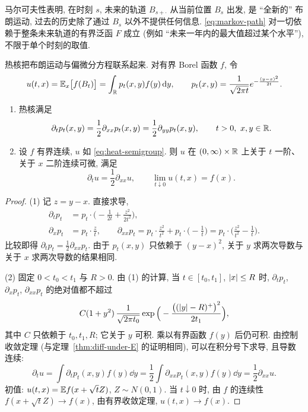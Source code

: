 \begin{intuition}
马尔可夫性表明, 在时刻 $s$, 未来的轨道 $B_{s+\cdot}$ 从当前位置 $B_s$ 出发, 是 ``全新的'' 布朗运动, 过去的历史除了通过 $B_s$ 以外不提供任何信息. \eqref{eq:markov-path} 对一切依赖于整条未来轨道的有界泛函 $F$ 成立 (例如 ``未来一年内的最大值超过某个水平''), 不限于单个时刻的取值.
\end{intuition}

热核把布朗运动与偏微分方程联系起来. 对有界 Borel 函数 $f$, 令
\begin{equation}\label{eq:heat-semigroup}
u(t,x)=\mathbb{E}_x\big[f(B_t)\big]=\int_{\mathbb{R}}p_t(x,y)f(y)\mathop{}\!\mathrm{d} y,\qquad p_t(x,y)=\frac{1}{\sqrt{2\pi t}}e^{-\frac{(y-x)^2}{2t}}.
\end{equation}

\begin{theorem}[热方程]\label{thm:heat-equation}
\begin{enumerate}
\item 热核满足
\[
\partial_tp_t(x,y)=\frac{1}{2}\partial_{xx}p_t(x,y)=\frac{1}{2}\partial_{yy}p_t(x,y),\qquad t>0,\ x,y\in\mathbb{R}.
\]
\item 设 $f$ 有界连续, $u$ 如 \eqref{eq:heat-semigroup}. 则 $u$ 在 $(0,\infty)\times\mathbb{R}$ 上关于 $t$ 一阶、关于 $x$ 二阶连续可微, 满足
\[
\partial_tu=\frac{1}{2}\partial_{xx}u,\qquad \lim_{t\downarrow0}u(t,x)=f(x).
\]
\end{enumerate}
\end{theorem}

\begin{proof}
(1) 记 $z=y-x$. 直接求导,
\begin{align*}
\partial_tp_t&=p_t\cdot\Big(-\frac{1}{2t}+\frac{z^2}{2t^2}\Big),\\
\partial_xp_t&=p_t\cdot\frac{z}{t},\qquad \partial_{xx}p_t=p_t\cdot\frac{z^2}{t^2}+p_t\cdot\Big(-\frac{1}{t}\Big)=p_t\cdot\Big(\frac{z^2}{t^2}-\frac{1}{t}\Big).
\end{align*}
比较即得 $\partial_tp_t=\frac{1}{2}\partial_{xx}p_t$. 由于 $p_t(x,y)$ 只依赖于 $(y-x)^2$, 关于 $y$ 求两次导数与关于 $x$ 求两次导数的结果相同.

(2) 固定 $0<t_0<t_1$ 与 $R>0$. 由 (1) 的计算, 当 $t\in[t_0,t_1]$, $\lvert x\rvert\le R$ 时, $\partial_tp_t$, $\partial_xp_t$, $\partial_{xx}p_t$ 的绝对值都不超过
\[
C(1+y^2)\,\frac{1}{\sqrt{2\pi t_0}}\exp\Big(-\frac{\big((\lvert y\rvert-R)^+\big)^2}{2t_1}\Big),
\]
其中 $C$ 只依赖于 $t_0,t_1,R$; 它关于 $y$ 可积. 乘以有界函数 $f(y)$ 后仍可积. 由控制收敛定理 (与定理~\ref{thm:diff-under-E} 的证明相同), 可以在积分号下求导, 且导数连续:
\[
\partial_tu=\int\partial_tp_t(x,y)f(y)\dd y=\frac{1}{2}\int\partial_{xx}p_t(x,y)f(y)\dd y=\frac{1}{2}\partial_{xx}u.
\]
初值: $u(t,x)=\mathbb{E} f(x+\sqrt{t}Z)$, $Z\sim N(0,1)$. 当 $t\downarrow0$ 时, 由 $f$ 的连续性 $f(x+\sqrt{t}Z)\to f(x)$, 由有界收敛定理, $u(t,x)\to f(x)$.
\end{proof}

